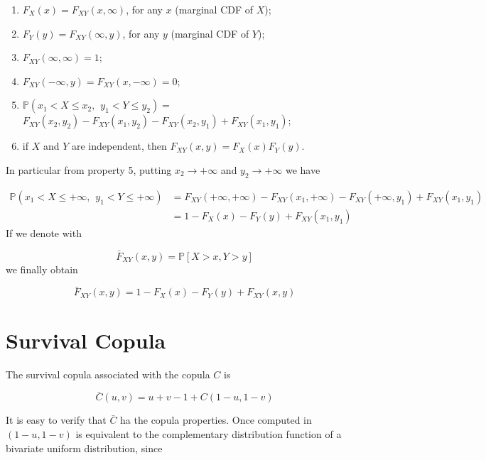 \documentclass{article}
\begin{document}
\begin{enumerate}
  \item  $F_X(x)=F_{XY}(x, \infty)$, for any $x$ (marginal CDF of $X$);
	\item  $F_Y(y)=F_{XY}(\infty,y)$, for any $y$ (marginal CDF of $Y$);
  \item  $F_{XY}(\infty, \infty)=1$;
  \item  $F_{XY}(-\infty, y)=F_{XY}(x,-\infty)=0$;
	\item 
   $\mathbb{P}(x_1 < X \leq x_2, \hspace{5pt} y_1  <Y \leq y_2)=$
     $F_{XY}(x_2,y_2)-F_{XY}(x_1,y_2)-F_{XY}(x_2,y_1)+F_{XY}(x_1,y_1)$;
	
  \item if $X$ and $Y$ are independent, then $F_{XY}(x,y)=F_X(x)F_Y(y)$.
\end{enumerate}

\noindent In particular from property 5, putting $x_2 \rightarrow +\infty$ and $y_2 \rightarrow +\infty$ we have

\begin{align}
\mathbb{P}(x_1 < X \leq +\infty, \hspace{5pt} y_1  <Y \leq +\infty) & =
     F_{XY}(+\infty,+\infty)-F_{XY}(x_1,+\infty)-F_{XY}(+\infty,y_1)+F_{XY}(x_1,y_1) \\
& = 1 - F_X(x) - F_Y(y) + F_{XY}(x_1,y_1)     
\end{align}
If we denote with 

\begin{equation}
\bar F_{XY}(x, y ) = \mathbb{P}[X > x, Y > y]
\end{equation}
we finally obtain

\begin{equation}
\bar F_{XY}(x, y ) = 1 - F_X(x) - F_Y(y) + F_{XY}(x, y)
\end{equation}
%
%
\section{Survival Copula}
The survival copula associated with the copula $C$ is

\begin{equation}
\bar C (u, v) = u + v - 1 + C(1-u, 1-v)
\end{equation}

It is easy to verify that $\bar C$ ha the copula properties. Once computed in $(1-u , 1-v)$ is equivalent to the complementary distribution function of a bivariate uniform distribution, since
\end{document}
